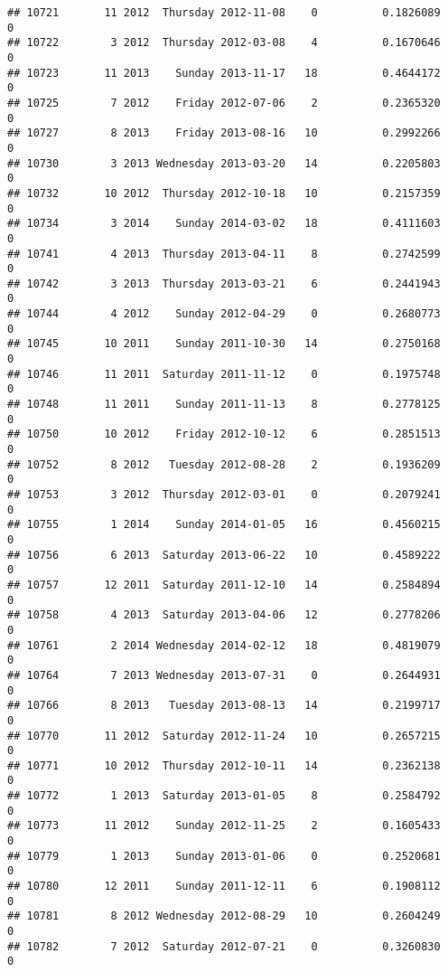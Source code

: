 \documentclass[
]{article}
\begin{document}
\begin{verbatim}
## 10721       11 2012  Thursday 2012-11-08    0          0.1826089             0
## 10722        3 2012  Thursday 2012-03-08    4          0.1670646             0
## 10723       11 2013    Sunday 2013-11-17   18          0.4644172             0
## 10725        7 2012    Friday 2012-07-06    2          0.2365320             0
## 10727        8 2013    Friday 2013-08-16   10          0.2992266             0
## 10730        3 2013 Wednesday 2013-03-20   14          0.2205803             0
## 10732       10 2012  Thursday 2012-10-18   10          0.2157359             0
## 10734        3 2014    Sunday 2014-03-02   18          0.4111603             0
## 10741        4 2013  Thursday 2013-04-11    8          0.2742599             0
## 10742        3 2013  Thursday 2013-03-21    6          0.2441943             0
## 10744        4 2012    Sunday 2012-04-29    0          0.2680773             0
## 10745       10 2011    Sunday 2011-10-30   14          0.2750168             0
## 10746       11 2011  Saturday 2011-11-12    0          0.1975748             0
## 10748       11 2011    Sunday 2011-11-13    8          0.2778125             0
## 10750       10 2012    Friday 2012-10-12    6          0.2851513             0
## 10752        8 2012   Tuesday 2012-08-28    2          0.1936209             0
## 10753        3 2012  Thursday 2012-03-01    0          0.2079241             0
## 10755        1 2014    Sunday 2014-01-05   16          0.4560215             0
## 10756        6 2013  Saturday 2013-06-22   10          0.4589222             0
## 10757       12 2011  Saturday 2011-12-10   14          0.2584894             0
## 10758        4 2013  Saturday 2013-04-06   12          0.2778206             0
## 10761        2 2014 Wednesday 2014-02-12   18          0.4819079             0
## 10764        7 2013 Wednesday 2013-07-31    0          0.2644931             0
## 10766        8 2013   Tuesday 2013-08-13   14          0.2199717             0
## 10770       11 2012  Saturday 2012-11-24   10          0.2657215             0
## 10771       10 2012  Thursday 2012-10-11   14          0.2362138             0
## 10772        1 2013  Saturday 2013-01-05    8          0.2584792             0
## 10773       11 2012    Sunday 2012-11-25    2          0.1605433             0
## 10779        1 2013    Sunday 2013-01-06    0          0.2520681             0
## 10780       12 2011    Sunday 2011-12-11    6          0.1908112             0
## 10781        8 2012 Wednesday 2012-08-29   10          0.2604249             0
## 10782        7 2012  Saturday 2012-07-21    0          0.3260830             0

\end{verbatim}
\end{document}
